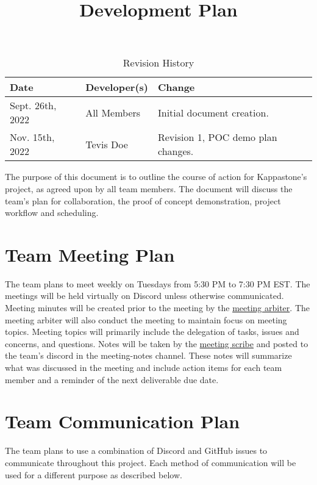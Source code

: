 \documentclass{article}
\title{Development Plan\\\progname}
\author{\authname}
\date{}
\begin{document}
\begin{table}[hp]
\caption{Revision History} \label{TblRevisionHistory}
\begin{tabularx}{\textwidth}{llX}
\toprule
\textbf{Date} & \textbf{Developer(s)} & \textbf{Change}\\
\midrule
Sept. 26th, 2022  & All Members & Initial document creation. \\
Nov. 15th, 2022 & Tevis Doe & Revision 1, POC demo plan changes. \\
\bottomrule
\end{tabularx}
\end{table}

\newpage

\maketitle

The purpose of this document is to outline the course of action for Kappastone's project, as agreed upon by all team members. The document will discuss the team's plan for collaboration, the proof of concept demonstration, project workflow and scheduling.   

\section{Team Meeting Plan}

The team plans to meet weekly on Tuesdays from 5:30 PM to 7:30 PM EST. The meetings will be held virtually on Discord unless otherwise communicated. Meeting minutes will be created prior to the meeting by the \hyperref[role:meetingarb]{meeting arbiter}. The meeting arbiter will also conduct the meeting to maintain focus on meeting topics. Meeting topics will primarily include the delegation of tasks, issues and concerns, and questions. Notes will be taken by the \hyperref[role:meetingscrib]{meeting scribe} and posted to the team's discord in the meeting-notes channel. These notes will summarize what was discussed in the meeting and include action items for each team member and a reminder of the next deliverable due date.

\section{Team Communication Plan}

The team plans to use a combination of Discord and GitHub issues to communicate throughout this project. Each method of communication will be used for a different purpose as described below.
\end{document}
